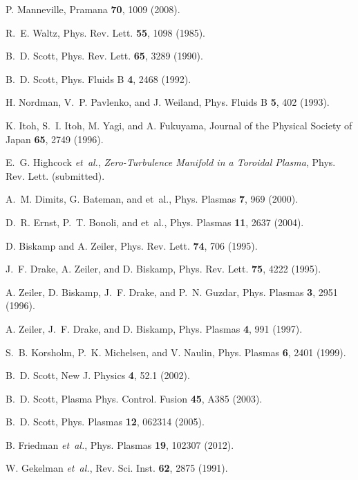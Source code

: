 \documentclass[showpacs,preprintnumbers,amsmath,amssymb,superscriptaddress,aip]{revtex4-1}
\begin{document}
\begin{thebibliography}{10}

P. Manneville, Pramana {\bf 70},  1009  (2008).

R.~E. Waltz, Phys. Rev. Lett. {\bf 55},  1098  (1985).

B.~D. Scott, Phys. Rev. Lett. {\bf 65},  3289  (1990).

B.~D. Scott, Phys. Fluids B {\bf 4},  2468  (1992).

H. Nordman, V.~P. Pavlenko, and J. Weiland, Phys. Fluids B {\bf 5},  402
  (1993).

K. Itoh, S.~I. Itoh, M. Yagi, and A. Fukuyama, Journal of the Physical Society
  of Japan {\bf 65},  2749  (1996).

E.~G. Highcock {\it et~al.}, \emph{Zero-Turbulence Manifold in a Toroidal Plasma}, Phys. Rev. Lett.  (submitted).

A.~M. Dimits, G. Bateman, and et~al., Phys. Plasmas {\bf 7},  969  (2000).

D.~R. Ernst, P.~T. Bonoli, and et~al., Phys. Plasmas {\bf 11},  2637  (2004).

D. Biskamp and A. Zeiler, Phys. Rev. Lett. {\bf 74},  706  (1995).

J.~F. Drake, A. Zeiler, and D. Biskamp, Phys. Rev. Lett. {\bf 75},  4222
  (1995).

A. Zeiler, D. Biskamp, J.~F. Drake, and P.~N. Guzdar, Phys. Plasmas {\bf 3},
  2951  (1996).

A. Zeiler, J.~F. Drake, and D. Biskamp, Phys. Plasmas {\bf 4},  991  (1997).

S.~B. Korsholm, P.~K. Michelsen, and V. Naulin, Phys. Plasmas {\bf 6},  2401
  (1999).

B.~D. Scott, New J. Physics {\bf 4},  52.1  (2002).

B.~D. Scott, Plasma Phys. Control. Fusion {\bf 45},  A385  (2003).

B.~D. Scott, Phys. Plasmas {\bf 12},  062314  (2005).

B. Friedman {\it et~al.}, Phys. Plasmas {\bf 19},  102307  (2012).

W. Gekelman {\it et~al.}, Rev. Sci. Inst. {\bf 62},  2875  (1991).


\end{thebibliography}
\end{document}
